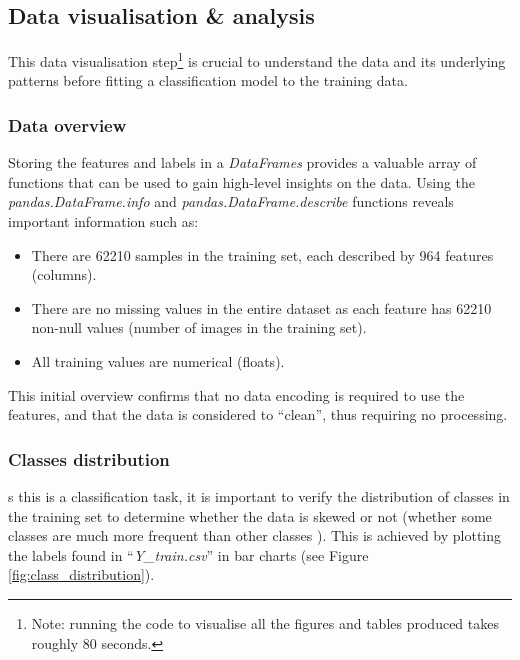 \documentclass[letterpaper,12pt]{article}
\begin{document}

\subsection{Data visualisation \& analysis}

This data visualisation step\footnote{Note: running the code to visualise all the figures and tables produced takes roughly 80 seconds.} is crucial to understand the data and its underlying patterns before fitting a classification model to the training data.

\subsubsection{Data overview}

Storing the features and labels in a \textit{DataFrames} provides a valuable array of functions that can be used to gain high-level insights on the data. Using the \textit{pandas.DataFrame.info} and \textit{pandas.DataFrame.describe} functions reveals important information such as:
\begin{itemize}
    \item There are 62210 samples in the training set, each described by 964 features (columns).
    \item There are no missing values in the entire dataset as each feature has 62210 non-null values (number of images in the training set).
    \item All training values are numerical (floats).
\end{itemize}

This initial overview confirms that no data encoding is required to use the features, and that the data is considered to ``clean'', thus requiring no processing.

\subsubsection{Classes distribution}
\label{sec:classes-distribution}

s this is a classification task, it is important to verify the distribution of classes in the training  set to determine whether the data is skewed or not (whether some classes are much more frequent than other classes \cite{Geron2019}). This is achieved by plotting the labels found in ``\textit{Y\_train.csv}'' in bar charts (see Figure \ref{fig:class_distribution}).\\
\end{document}

